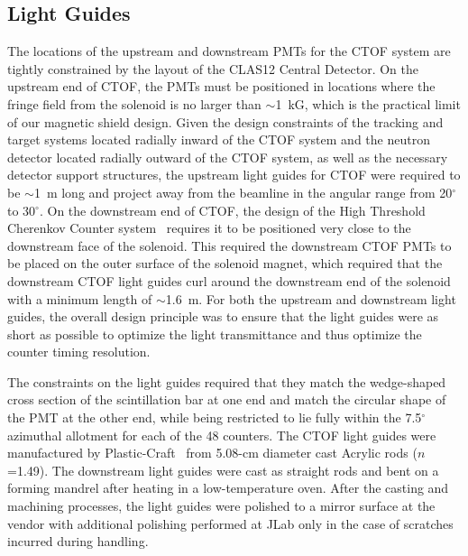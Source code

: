 \documentclass{elsart}
\begin{document}
\subsection{Light Guides}

The locations of the upstream and downstream PMTs for the CTOF system are tightly constrained
by the layout of the CLAS12 Central Detector. On the upstream end of CTOF, the PMTs must
be positioned in locations where the fringe field from the solenoid is no larger than $\sim$1~kG,
which is the practical limit of our magnetic shield design. Given the design constraints of
the tracking and target systems located radially inward of the CTOF system and the neutron
detector located radially outward of the CTOF system, as well as the necessary detector support 
structures, the upstream light guides for CTOF were required to be $\sim$1~m long and project 
away from the beamline in the angular range from 20$^\circ$ to 30$^\circ$. On the downstream 
end of CTOF, the design of the High Threshold Cherenkov Counter system~\cite{htcc-ref} requires
it to be positioned very close to the downstream face of the solenoid. This required the downstream
CTOF PMTs to be placed on the outer surface of the solenoid magnet, which required that the
downstream CTOF light guides curl around the downstream end of the solenoid with a minimum length
of $\sim$1.6~m. For both the upstream and downstream light guides, the overall design principle was 
to ensure that the light guides were as short as possible to optimize the light transmittance and 
thus optimize the counter timing resolution.

The constraints on the light guides required that they match the wedge-shaped cross section
of the scintillation bar at one end and match the circular shape of the PMT at the other end,
while being restricted to lie fully within the 7.5$^\circ$ azimuthal allotment for each of the
48 counters. The CTOF light guides were manufactured by Plastic-Craft~\cite{plas-ref} from
5.08-cm diameter cast Acrylic rods ($n$=1.49). The downstream light guides were cast as straight
rods and bent on a forming mandrel after heating in a low-temperature oven. After the casting and 
machining processes, the light guides were polished to a mirror surface at the vendor with 
additional polishing performed at JLab only in the case of scratches incurred during handling.
\end{document}
